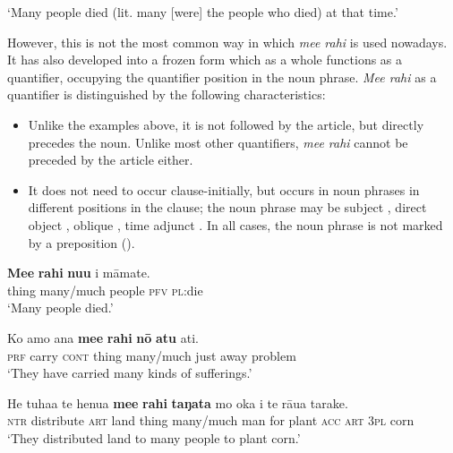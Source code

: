 \glt
‘Many people died (lit. many [were] the people who died) at that time.’ \textstyleExampleref{[R250.093]} 
\z

However, this is not the most common way in which \textit{me{\ꞌ}e rahi} is used nowadays. It has also developed into a frozen form which as a whole functions as a quantifier, occupying the quantifier position in the noun phrase. \textit{Me{\ꞌ}e rahi} as a quantifier is distinguished by the following characteristics:

\begin{itemize}
\item 
Unlike the examples above, it is not followed by the article, but directly precedes the noun. Unlike most other quantifiers, \textit{me{\ꞌ}e rahi} cannot be preceded by the article either.

\item 
It does not need to occur clause-initially, but occurs in noun phrases in different positions in the clause; the noun phrase may be subject , direct object , oblique , time adjunct . In all cases, the noun phrase is not marked by a preposition ().

\end{itemize}

\ea\label{ex:4.90}
\gll \textbf{Me{\ꞌ}e} \textbf{rahi} \textbf{nu{\ꞌ}u} i māmate. \\
thing many/much people \textsc{pfv} \textsc{pl}:die \\

\glt 
‘Many people died.’ \textstyleExampleref{[R532-05.002]}
\z

\ea\label{ex:4.91}
\gll Ko {\ꞌ}amo {\ꞌ}ana \textbf{me{\ꞌ}e} \textbf{rahi} \textbf{nō} \textbf{atu} {\ꞌ}ati. \\
\textsc{prf} carry \textsc{cont} thing many/much just away problem \\

\glt 
‘They have carried many kinds of sufferings.’ \textstyleExampleref{[1 Tim. 6:10]}
\z

\ea\label{ex:4.92}
\gll He tuha{\ꞌ}a te henua \textbf{me{\ꞌ}e} \textbf{rahi} \textbf{taŋata} mo {\ꞌ}oka i te rāua tarake. \\
\textsc{ntr} distribute \textsc{art} land thing many/much man for plant \textsc{acc} \textsc{art} \textsc{3pl} corn \\

\glt 
‘They distributed land to many people to plant corn.’ \textstyleExampleref{[R424.013]} 
\z


